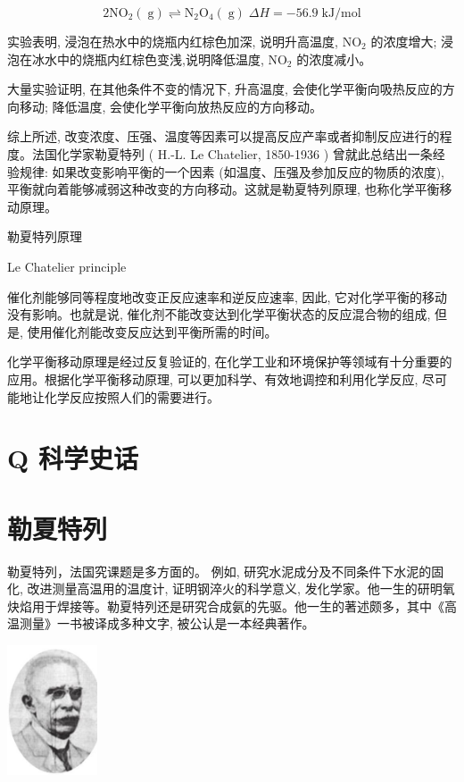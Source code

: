 \documentclass[10pt]{article}
\begin{document}
\[
2{\mathrm{{NO}}}_{2}\left( \mathrm{\;g}\right) \rightleftharpoons {\mathrm{N}}_{2}{\mathrm{O}}_{4}\left( \mathrm{\;g}\right) \;{\Delta H} = - {56.9}\mathrm{\;{kJ}}/\mathrm{{mol}}
\]

实验表明, 浸泡在热水中的烧瓶内红棕色加深, 说明升高温度, \({\mathrm{{NO}}}_{2}\) 的浓度增大; 浸泡在冰水中的烧瓶内红棕色变浅,说明降低温度, \({\mathrm{{NO}}}_{2}\) 的浓度减小。

大量实验证明, 在其他条件不变的情况下, 升高温度, 会使化学平衡向吸热反应的方向移动; 降低温度, 会使化学平衡向放热反应的方向移动。

综上所述, 改变浓度、压强、温度等因素可以提高反应产率或者抑制反应进行的程度。法国化学家勒夏特列 ( H.-L. Le Chatelier, 1850-1936 ) 曾就此总结出一条经验规律: 如果改变影响平衡的一个因素 (如温度、压强及参加反应的物质的浓度), 平衡就向着能够减弱这种改变的方向移动。这就是勒夏特列原理, 也称化学平衡移动原理。

\begin{mdframed}

勒夏特列原理

Le Chatelier principle

\end{mdframed}

催化剂能够同等程度地改变正反应速率和逆反应速率, 因此, 它对化学平衡的移动没有影响。也就是说, 催化剂不能改变达到化学平衡状态的反应混合物的组成, 但是, 使用催化剂能改变反应达到平衡所需的时间。

化学平衡移动原理是经过反复验证的, 在化学工业和环境保护等领域有十分重要的应用。根据化学平衡移动原理, 可以更加科学、有效地调控和利用化学反应, 尽可能地让化学反应按照人们的需要进行。

\section*{Q 科学史话}

\section*{勒夏特列}

勒夏特列，法国究课题是多方面的。 例如, 研究水泥成分及不同条件下水泥的固化, 改进测量高温用的温度计, 证明钢淬火的科学意义, 发化学家。他一生的研明氧炔焰用于焊接等。勒夏特列还是研究合成氨的先驱。他一生的著述颇多，其中《高温测量》一书被译成多种文字, 被公认是一本经典著作。

\begin{center}
\includegraphics[max width=0.2\textwidth]{images/0190da9d-8bfd-732f-bc2c-0b21d0f13b91_45_566632.jpg}
\end{center}
\end{document}
